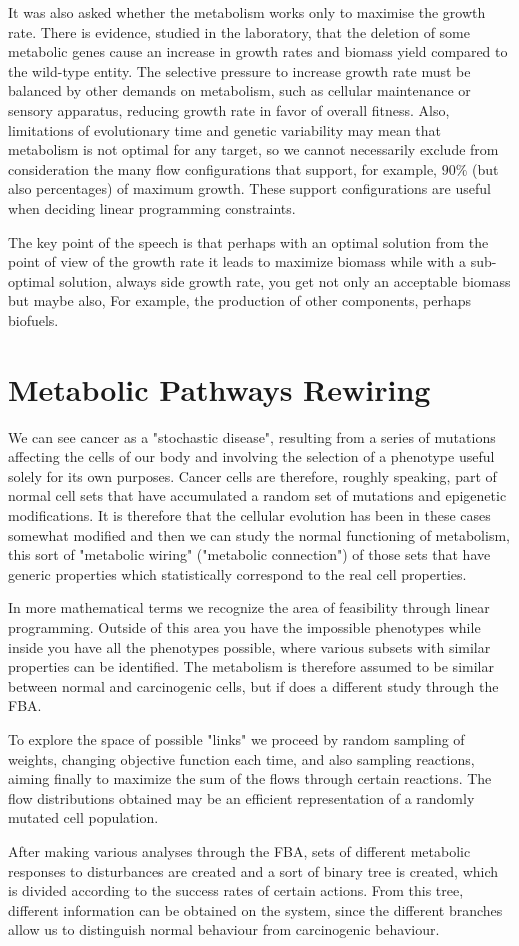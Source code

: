 It was also asked whether the metabolism works only to maximise the growth rate. There is
evidence, studied in the laboratory, that the deletion of some metabolic genes cause an 
increase in growth rates and biomass yield compared to the wild-type entity. The selective 
pressure to increase growth rate must be balanced by other demands on metabolism, such as 
cellular maintenance or sensory apparatus, reducing growth rate in favor of overall fitness. 
Also, limitations of evolutionary time and genetic variability may mean that metabolism is not 
optimal for any target, so we cannot necessarily exclude from consideration the many flow 
configurations that support, for example, $90\%$  (but also percentages) of maximum growth.
These support configurations are useful when deciding linear programming constraints.

The key point of the speech is that perhaps with an optimal solution from the point of view 
of the growth rate it leads to maximize biomass while with a sub-optimal solution, always side 
growth rate, you get not only an acceptable biomass but maybe also, For example, the 
production of other components, perhaps biofuels.
\section{Metabolic Pathways Rewiring}
We can see cancer as a "stochastic disease", resulting from a series of mutations affecting the 
cells of our body and involving the selection of a phenotype useful solely for its own purposes. 
Cancer cells are therefore, roughly speaking, part of normal cell sets that have accumulated a 
random set of mutations and epigenetic modifications. It is therefore that the cellular evolution 
has been in these cases somewhat modified and then we can study the normal functioning of metabolism, 
this sort of "metabolic wiring" ("metabolic connection") of those sets that have generic properties 
which statistically correspond to the real cell properties. 

In more mathematical terms we recognize the area of feasibility through linear programming. Outside of 
this area you have the impossible phenotypes while inside you have all the phenotypes possible, where 
various subsets with similar properties can be identified. The metabolism is therefore assumed to be 
similar between normal and carcinogenic cells, but if does a different study through the FBA.

To explore the space of possible "links" we proceed by random sampling of weights, changing objective 
function each time, and also sampling reactions, aiming finally to maximize the sum of the flows through 
certain reactions. The flow distributions obtained may be an efficient representation of a randomly 
mutated cell population. 

After making various analyses through the FBA, sets of different metabolic responses to disturbances 
are created and a sort of binary tree is created, which is divided according to the success rates of 
certain actions. From this tree, different information can be obtained on the system, since the different 
branches allow us to distinguish normal behaviour from carcinogenic behaviour.